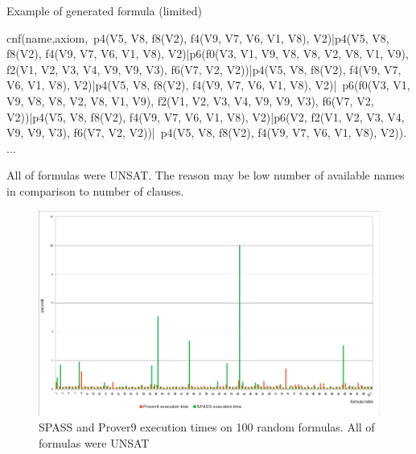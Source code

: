 \begin{listing}[H]
  \caption{Example of generated formula (limited)}
\begin{tptpcode}
% 
cnf(name,axiom,~p4(V5, V8, f8(V2), f4(V9, V7, V6, V1, V8), V2)|p4(V5, V8, f8(V2), f4(V9, V7, V6, V1, V8), V2)|p6(f0(V3, V1, V9, V8, V8, V2, V8, V1, V9), f2(V1, V2, V3, V4, V9, V9, V3), f6(V7, V2, V2))|p4(V5, V8, f8(V2), f4(V9, V7, V6, V1, V8), V2)|p4(V5, V8, f8(V2), f4(V9, V7, V6, V1, V8), V2)|~p6(f0(V3, V1, V9, V8, V8, V2, V8, V1, V9), f2(V1, V2, V3, V4, V9, V9, V3), f6(V7, V2, V2))|p4(V5, V8, f8(V2), f4(V9, V7, V6, V1, V8), V2)|p6(V2, f2(V1, V2, V3, V4, V9, V9, V3), f6(V7, V2, V2))|~p4(V5, V8, f8(V2), f4(V9, V7, V6, V1, V8), V2)).
...
\end{tptpcode}
\end{listing}

All of formulas were UNSAT. The reason may be low number of available names in comparison to number of clauses.

\begin{figure}[ht]
\begin{centering}
  \includegraphics[width=\textwidth]{logic-formula-generator/dataset_analysis/execution_times.png}
  \caption{SPASS and Prover9 execution times on 100 random formulas. All of formulas were UNSAT}
  \label{pic:benchmark_results}
\end{centering}
\end{figure}

